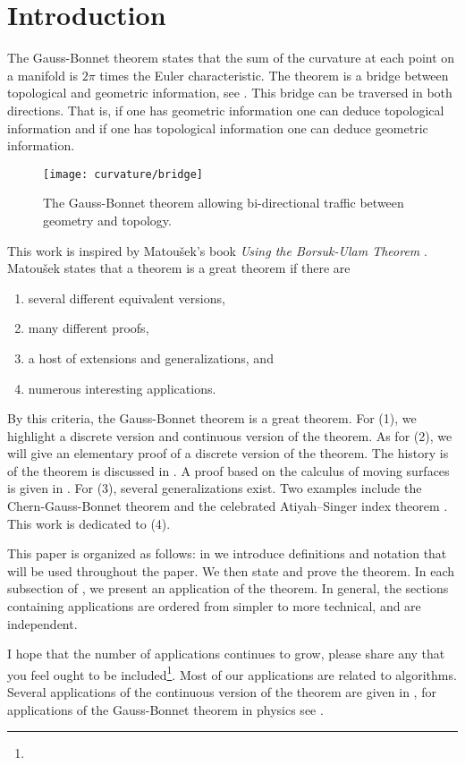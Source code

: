 \section{Introduction}
\label{sec:intro}


The Gauss-Bonnet theorem states that the sum of the curvature
at each point on a manifold is $2\pi$ times the Euler characteristic.
The theorem is a bridge between topological
and geometric information, see . 
This bridge can be traversed in both directions.
That is, if one has geometric information one can deduce topological information and
if one has topological information one can deduce geometric information.


\begin{figure}[htb]
\centering
\texttt{[image: curvature/bridge]}
\caption{The Gauss-Bonnet theorem allowing bi-directional traffic
between geometry and topology.}
\label{fig:bridge}
\end{figure}

This work is inspired by Matou\v{s}ek's book \emph{Using the Borsuk-Ulam Theorem}
\cite{jm08}.
Matou\v{s}ek states that a theorem is a great theorem if there are
\begin{enumerate}[(1)]
\item several different equivalent versions,
\item many different proofs,
\item a host of extensions and generalizations, and
\item numerous interesting applications.
\end{enumerate}

By this criteria, the Gauss-Bonnet theorem is a great theorem.
For (1), we highlight a discrete version and continuous version of the theorem.
As for (2), we will give an elementary proof of a discrete version of the theorem.
The history is of the theorem is discussed in \cite{wu_historical_2008}.
A proof based on the calculus of
moving surfaces is given in \cite{grinfeld_introduction_2013}.
For (3), several generalizations exist. Two examples include
the Chern-Gauss-Bonnet theorem \cite{chern_simple_1944} and the celebrated Atiyah–Singer index 
theorem \cite{atiyah_index_1963}.
This work is dedicated to (4).

This paper is organized as follows:
in  we introduce definitions and notation that will be used
throughout the paper. We then state and prove the theorem.
In each subsection of , we present an application of the theorem.
In general, the sections containing applications are ordered from simpler to more technical,
and are independent.


I hope that the number of applications continues to grow,
please share any that you feel
ought to be included\footnote{}.
Most of our applications are related to algorithms. 
Several applications of the continuous version of the theorem
are given in \cite{doc76,pressley_elementary_2010}, for applications of the Gauss-Bonnet 
theorem in physics see \cite{tirado-physics-apps,gibbons_applications_2008}.